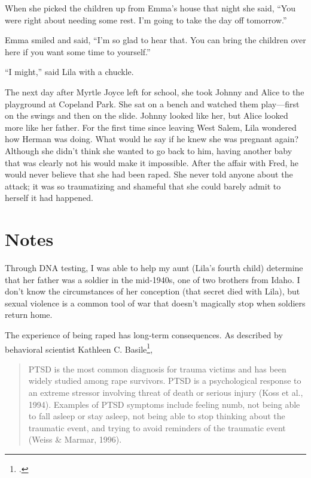 \documentclass[
  letterpaper,
]{book}
\begin{document}
When she picked the children up from Emma's house that night she said,
``You were right about needing some rest. I'm going to take the day off
tomorrow.''

Emma smiled and said, ``I'm so glad to hear that. You can bring the
children over here if you want some time to yourself.''

``I might,'' said Lila with a chuckle.

The next day after Myrtle Joyce left for school, she took Johnny and
Alice to the playground at Copeland Park. She sat on a bench and watched
them play---first on the swings and then on the slide. Johnny looked
like her, but Alice looked more like her father. For the first time
since leaving West Salem, Lila wondered how Herman was doing. What would
he say if he knew she was pregnant again? Although she didn't think she
wanted to go back to him, having another baby that was clearly not his
would make it impossible. After the affair with Fred, he would never
believe that she had been raped. She never told anyone about the attack;
it was so traumatizing and shameful that she could barely admit to
herself it had happened.

\section{Notes}\label{notes-47}

Through DNA testing, I was able to help my aunt (Lila's fourth child)
determine that her father was a soldier in the mid-1940s, one of two
brothers from Idaho. I don't know the circumstances of her conception
(that secret died with Lila), but sexual violence is a common tool of
war that doesn't magically stop when soldiers return home.

The experience of being raped has long-term consequences. As described
by behavioral scientist Kathleen C. Basile\footnote{.},

\begin{quote}
PTSD is the most common diagnosis for trauma victims and has been widely
studied among rape survivors. PTSD is a psychological response to an
extreme stressor involving threat of death or serious injury (Koss et
al., 1994). Examples of PTSD symptoms include feeling numb, not being
able to fall asleep or stay asleep, not being able to stop thinking
about the traumatic event, and trying to avoid reminders of the
traumatic event (Weiss \& Marmar, 1996).
\end{quote}
\end{document}
